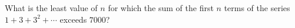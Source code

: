 What is the least value of $n$ for which the sum of the first $n$ terms of the series $1+3+3^2+\cdots$ exceeds $7000$?
